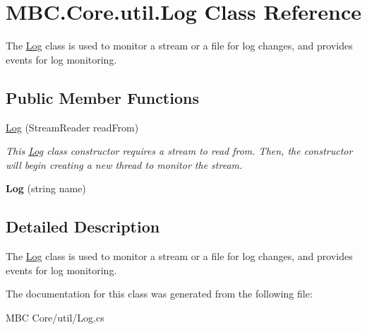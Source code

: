 \hypertarget{class_m_b_c_1_1_core_1_1util_1_1_log}{\section{M\-B\-C.\-Core.\-util.\-Log Class Reference}
\label{class_m_b_c_1_1_core_1_1util_1_1_log}
}


The \hyperlink{class_m_b_c_1_1_core_1_1util_1_1_log}{Log} class is used to monitor a stream or a file for log changes, and provides events for log monitoring. 


\subsection*{Public Member Functions}
\begin{DoxyCompactItemize}
\item 
\hypertarget{class_m_b_c_1_1_core_1_1util_1_1_log_a2cd8fbd24c6339b8d9c4855476dc29a1}{\hyperlink{class_m_b_c_1_1_core_1_1util_1_1_log_a2cd8fbd24c6339b8d9c4855476dc29a1}{Log} (Stream\-Reader read\-From)}\label{class_m_b_c_1_1_core_1_1util_1_1_log_a2cd8fbd24c6339b8d9c4855476dc29a1}

\begin{DoxyCompactList}\small\item\em This \hyperlink{class_m_b_c_1_1_core_1_1util_1_1_log}{Log} class constructor requires a stream to read from. Then, the constructor will begin creating a new thread to monitor the stream.\end{DoxyCompactList}\item 
\hypertarget{class_m_b_c_1_1_core_1_1util_1_1_log_adea40d75bea8396044ab77b8f950d81d}{{\bfseries Log} (string name)}\label{class_m_b_c_1_1_core_1_1util_1_1_log_adea40d75bea8396044ab77b8f950d81d}

\end{DoxyCompactItemize}


\subsection{Detailed Description}
The \hyperlink{class_m_b_c_1_1_core_1_1util_1_1_log}{Log} class is used to monitor a stream or a file for log changes, and provides events for log monitoring.

The documentation for this class was generated from the following file\-:\begin{DoxyCompactItemize}
\item 
M\-B\-C Core/util/Log.\-cs\end{DoxyCompactItemize}
